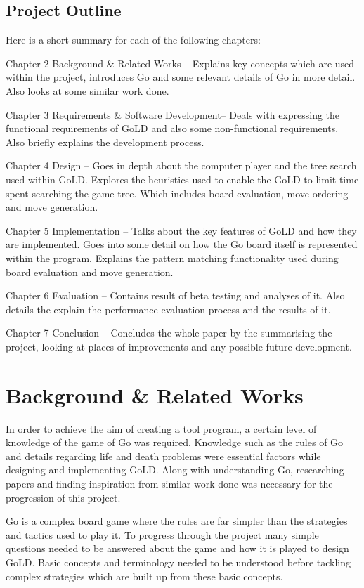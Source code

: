 \documentclass{l4proj}
\begin{document}
\section{Project Outline}

Here is a short summary for each of the following chapters:

Chapter 2 Background \& Related Works – Explains key concepts which are used within the project, introduces Go and some relevant details of Go in more detail. Also looks at some similar work done.

Chapter 3 Requirements \& Software Development– Deals with expressing the functional requirements of GoLD and also some non-functional requirements. Also briefly explains the development process.


Chapter 4 Design – Goes in depth about the computer player and the tree search used within GoLD.  Explores the heuristics used to enable the GoLD to limit time spent searching the game tree. Which includes board evaluation, move ordering and move generation.

Chapter 5 Implementation – Talks about the key features of GoLD and how they are implemented. Goes into some detail on how the Go board itself is represented within the program. Explains the pattern matching functionality used during board evaluation and move generation.

Chapter 6 Evaluation – Contains result of beta testing and analyses of it. Also details the explain the performance evaluation process and the results of it.

Chapter 7 Conclusion – Concludes the whole paper by the summarising the project, looking at places of improvements and any possible future development.








\chapter{Background \& Related Works}
In order to achieve the aim of creating a tool program, a certain level of knowledge of the game of Go was required. Knowledge such as the rules of Go and details regarding life and death problems were essential factors while designing and implementing GoLD. Along with understanding Go, researching papers and finding inspiration from similar work done was necessary for the progression of this project.

Go is a complex board game where the rules are far simpler than the strategies and tactics used to play it.  To progress through the project many simple questions needed to be answered about the game and how it is played to design GoLD. Basic concepts and terminology needed to be understood before tackling complex strategies which are built up from these basic concepts.
\end{document}
